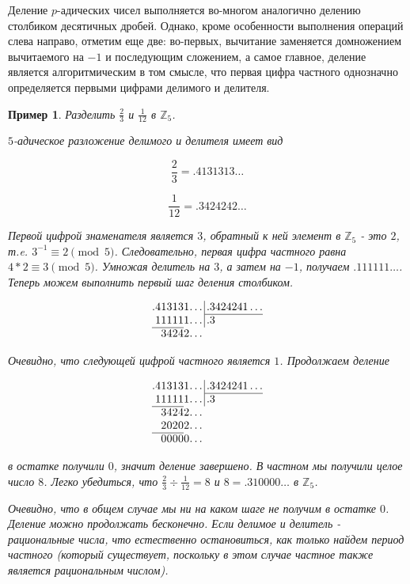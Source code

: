 \documentclass[master, och, diploma, times]{sty/SCWorks}
\theoremstyle{plain}
\newtheorem{exmp}{Пример}[section]
\theoremstyle{definition}
\begin{document}
Деление $p$-адических чисел выполняется во-многом аналогично делению столбиком десятичных дробей. Однако, кроме особенности выполнения операций слева направо, отметим еще две: во-первых, вычитание заменяется домножением вычитаемого на $-1$ и последующим сложением, а самое главное, деление является алгоритмическим в том смысле, что первая цифра частного однозначно определяется первыми цифрами делимого и делителя.

\begin{exmp}
Разделить $\frac{2}{3}$ и $\frac{1}{12}$ в $\mathbb{Z}_5$.

\noindent $5$-адическое разложение делимого и делителя имеет вид

$$
\frac{2}{3}=.4131313\dots
$$

$$
\frac{1}{12}=.3424242\dots
$$

\noindent Первой цифрой знаменателя является $3$, обратный к ней элемент в $\mathbb{Z}_5$ - это $2$, т.e. $3^{-1} \equiv 2 \pmod 5$. Следовательно, первая цифра частного равна $4*2 \equiv 3 \pmod 5$. Умножая делитель на $3$, а затем на $-1$, получаем $.111111\dots$. Теперь можем выполнить первый шаг деления столбиком.

$$
\arraycolsep=0.01em
\begin{array}{rrrrrrrr@{\,}r|l}
.&4&1&3&1&3&1&\dots&&\,.3424241\dots\\
\cline{10-10}
&1&1&1&1&1&1&\dots&&\,.3\\
\cline{1-6}
&&3&4&2&4&2&\dots
\end{array}
$$

\noindent Очевидно, что следующей цифрой частного является $1$. Продолжаем деление 

$$
\arraycolsep=0.01em
\begin{array}{rrrrrrrr@{\,}r|l}
.&4&1&3&1&3&1&\dots&&\,.3424241\dots\\
\cline{10-10}
&1&1&1&1&1&1&\dots&&\,.3\\
\cline{1-6}
&&3&4&2&4&2&\dots \\
&&2&0&2&0&2&\dots \\
\cline{1-6}
&&0&0&0&0&0&\dots
\end{array}
$$

в остатке получили $0$, значит деление завершено. В частном мы получили целое число $8$. Легко убедиться, что $\frac{2}{3} \div \frac{1}{12}=8$ и $8=.310000\dots$ в $\mathbb{Z}_5$.

Очевидно, что в общем случае мы ни на каком шаге не получим в остатке $0$. Деление можно продолжать бесконечно. Если делимое и делитель - рациональные числа, что естественно остановиться, как только найдем период частного (который существует, поскольку в этом случае частное также является рациональным числом).


\end{exmp}
\end{document}
